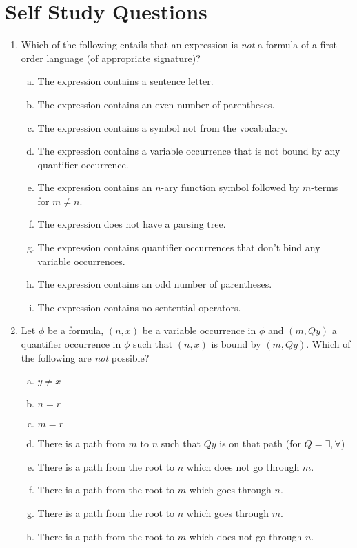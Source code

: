 \section{Self Study Questions}

\begin{enumerate}[\thesection.1]

\item Which of the following entails that an expression is \emph{not}
  a formula of a first-order language (of appropriate signature)?

\begin{enumerate}[(a)]
\item The expression contains a sentence letter.
\item The expression contains an even number of parentheses.
\item The expression contains a symbol not from the vocabulary.
\item The expression contains a variable occurrence that is not bound
  by any quantifier occurrence.
\item The expression contains an $n$-ary function symbol followed by
  $m$-terms for $m\neq n$.
\item The expression does not have a parsing tree.
\item The expression contains quantifier occurrences that don't bind
  any variable occurrences.
\item The expression contains an odd number of parentheses.  
\item The expression contains no sentential operators.
\end{enumerate}

\item Let $\phi$ be a formula,  $(n,x)$ be a variable occurrence in
  $\phi$ and $(m,Qy)$ a quantifier occurrence in $\phi$ such that
  $(n,x)$ is bound by $(m,Qy)$. Which of the following are \emph{not}
  possible?

\begin{enumerate}[(a)]
\item $y\neq x$
\item $n=r$
\item $m=r$
\item There is a path from $m$ to $n$ such that $Qy$ is on that path
  (for $Q=\exists,\forall$)
\item There is a path from the root to $n$ which does not go through
  $m$.
\item There is a path from the root to $m$ which goes through $n$.
\item There is a path from the root to $n$ which goes through $m$.
\item There is a path from the root to $m$ which does not go through $n$.
\end{enumerate}


\end{enumerate}
